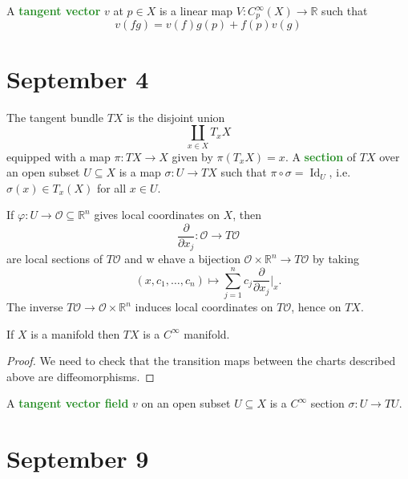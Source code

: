 \documentclass[11pt]{scrartcl}
\providecommand{\RR}{\mathbb R}
\providecommand{\vocab}[1]{{\textbf{\textcolor{ForestGreen}{#1}}}}
\begin{document}
\begin{definition}
    \label{def:tangent-vector}
    A \vocab{tangent vector} $v$ at $p\in X$ is a linear map
    $V\colon C^\infty_p(X)\to\RR$ such that
    \begin{equation*}
        v(fg) = v(f)g(p) + f(p)v(g)
    \end{equation*}
\end{definition}

\section{September 4}\label{sec:sep4}

\begin{definition}
    \label{def:tangent-bundle}
    The tangent bundle $TX$ is the disjoint union
    \begin{equation*}
	\coprod_{x\in X} T_xX
    \end{equation*}
    equipped with a map $\pi\colon TX\to X$
    given by $\pi(T_xX) = x$.
    A \vocab{section} of $TX$ over an open subset $U\subseteq X$
    is a map $\sigma\colon U\to TX$ such that
    $\pi\circ\sigma = \operatorname{Id}_U$,
    i.e. $\sigma(x)\in T_x(X)$ for all $x\in U$.
\end{definition}

If $\varphi\colon U\to\mathscr O\subseteq\RR^n$
gives local coordinates on $X$, then
\begin{equation*}
    \frac{\partial}{\partial x_j}\colon \mathscr O\to T\mathscr O
\end{equation*}
are local sections of $T\mathscr O$ and w ehave a bijection
$\mathscr O\times\RR^n\to T\mathscr O$ by taking
\begin{equation*}
    (x,c_1,\dots,c_n) \mapsto
    \sum_{j=1}^n c_j\frac\partial{\partial x_j}\bigg\vert_x.
\end{equation*}
The inverse $T\mathscr O\to\mathscr O\times\RR^n$
induces local coordinates on $T\mathscr O$, hence on $TX$.

\begin{prop}
    \label{prop:tangent-bundle-is-mfld}
    If $X$ is a manifold then $TX$ is a $C^\infty$ manifold.
\end{prop}

\begin{proof}
    We need to check that the transition maps between the charts
    described above are diffeomorphisms.
\end{proof}

\begin{definition}
    \label{def:tangent-vector-field}
    A \vocab{tangent vector field} $v$ on an open subset $U\subseteq X$
    is a $C^\infty$ section $\sigma\colon U\to TU$.
\end{definition}

\section{September 9}\label{sec:sep9}
\end{document}
